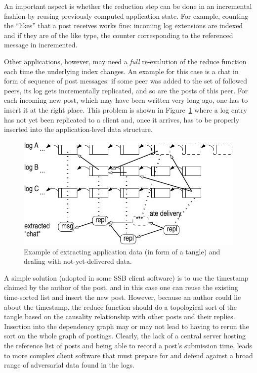 \documentclass[9pt,sigconf,rewiew]{acmart}
\begin{document}
An important aspect is whether the reduction step can be done in an
incremental fashion by reusing previously computed application state.
For example, counting the ``likes'' that a post receives works fine:
incoming log extensions are indexed and if they are of the like type,
the counter corresponding to the referenced message in incremented.

Other applications, however, may need a {\em full} re-evalution of the
reduce function each time the underlying index changes. An example for
this case is a chat in form of sequence of post messages: if some peer was added to
the set of followed peers, its log gets incrementally replicated, and
so are the posts of this peer. For each incoming new post, which may
have been written very long ago, one has to insert it at the right
place. This problem is shown in Figure~\ref{fig:tangle} where a log
entry has not yet been replicated to a client and, once it arrives,
has to be properly inserted into the application-level data structure.

\begin{figure}[htb]
  \includegraphics[width=0.9\columnwidth]{figs/tangle.pdf}
  \caption{Example of extracting application data (in form of
    a tangle) and dealing
    with not-yet-delivered data.\label{fig:tangle}}
\end{figure}

A simple solution (adopted in some SSB client software) is to use the
timestamp claimed by the author of the post, and in this case one can
reuse the existing time-sorted list and insert the new post. However,
because an author could lie about the timestamp, the reduce function
should do a topological sort of the tangle based on the causality relationship with
other posts and their replies. Insertion into the dependency graph may
or may not lead to having to rerun the sort on the whole graph of
postings. Clearly, the lack of a central server hosting the reference
list of posts and being able to record a post's submission time, leads
to more complex client software that must prepare for and defend
against a broad range of adversarial data found in the logs.
\end{document}
